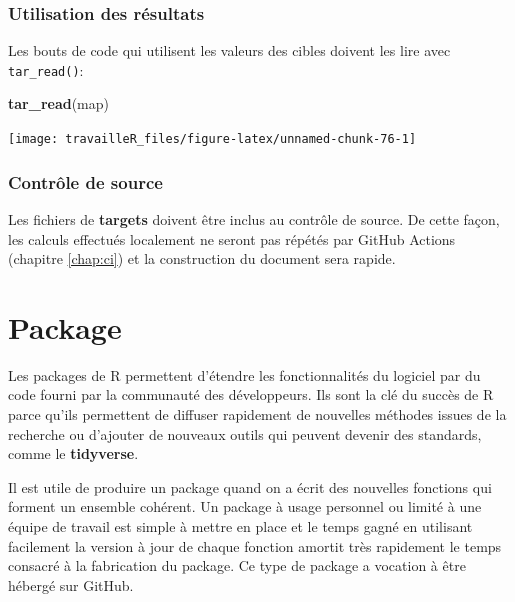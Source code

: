 \documentclass[
  12pt,
  french,
  a4paper,
  extrafontsizes,onecolumn,openright
  ]{memoir}
\newenvironment{Shaded}{\begin{snugshade}}{\end{snugshade}}
\newcommand{\KeywordTok}[1]{\textcolor[rgb]{0.13,0.29,0.53}{\textbf{#1}}}
\newcommand{\NormalTok}[1]{#1}
\begin{document}
\hypertarget{utilisation-des-ruxe9sultats}{%
\subsection{Utilisation des résultats}\label{utilisation-des-ruxe9sultats}}

Les bouts de code qui utilisent les valeurs des cibles doivent les lire avec \texttt{tar\_read()}:

\scriptsize

\begin{Shaded}
\begin{Highlighting}[]
\KeywordTok{tar_read}\NormalTok{(map)}
\end{Highlighting}
\end{Shaded}

\begin{center}\texttt{[image: travailleR\_files/figure-latex/unnamed-chunk-76-1]} \end{center}

\normalsize

\hypertarget{contruxf4le-de-source}{%
\subsection{Contrôle de source}\label{contruxf4le-de-source}}

Les fichiers de \textbf{targets} doivent être inclus au contrôle de source.
De cette façon, les calculs effectués localement ne seront pas répétés par GitHub Actions (chapitre \ref{chap:ci}) et la construction du document sera rapide.

\hypertarget{chap:package}{%
\chapter{Package}\label{chap:package}}

Les packages de R permettent d'étendre les fonctionnalités du logiciel par du code fourni par la communauté des développeurs.
Ils sont la clé du succès de R parce qu'ils permettent de diffuser rapidement de nouvelles méthodes issues de la recherche ou d'ajouter de nouveaux outils qui peuvent devenir des standards, comme le \textbf{tidyverse}.

Il est utile de produire un package quand on a écrit des nouvelles fonctions qui forment un ensemble cohérent.
Un package à usage personnel ou limité à une équipe de travail est simple à mettre en place et le temps gagné en utilisant facilement la version à jour de chaque fonction amortit très rapidement le temps consacré à la fabrication du package.
Ce type de package a vocation à être hébergé sur GitHub.
\end{document}
